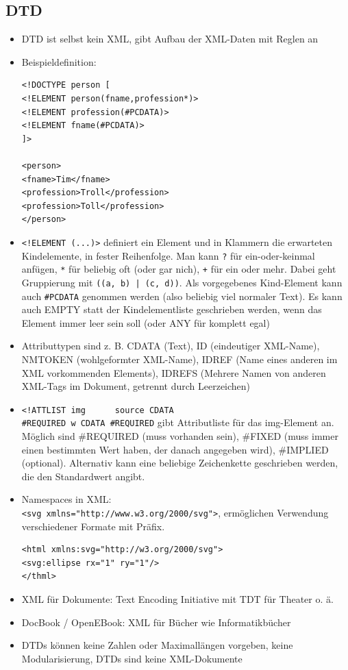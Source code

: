 \documentclass[12pt,landscape]{article}
\begin{document}
\begin{multicols}{3}
\subsection{DTD}
\begin{itemize}
\item DTD ist selbst kein XML, gibt Aufbau der XML-Daten mit Reglen an
\item Beispieldefinition:
\begin{lstlisting}
<!DOCTYPE person [
<!ELEMENT person(fname,profession*)>
<!ELEMENT profession(#PCDATA)>
<!ELEMENT fname(#PCDATA)>
]>

<person>
<fname>Tim</fname>
<profession>Troll</profession>
<profession>Toll</profession>
</person>
\end{lstlisting}
\item \lstinline|<!ELEMENT (...)>| definiert ein Element und in Klammern die erwarteten Kindelemente, in fester Reihenfolge. Man kann \lstinline|?| für ein-oder-keinmal anfügen, \lstinline|*| für beliebig oft (oder gar nich), \lstinline|+| für ein oder mehr. Dabei geht Gruppierung mit \lstinline{((a, b) | (c, d))}. Als vorgegebenes Kind-Element kann auch \lstinline|#PCDATA| genommen werden (also beliebig viel normaler Text). Es kann auch EMPTY statt der Kindelementliste geschrieben werden, wenn das Element immer leer sein soll (oder ANY für komplett egal)
\item Attributtypen sind z. B. CDATA (Text), ID (eindeutiger XML-Name), NMTOKEN (wohlgeformter XML-Name), IDREF (Name eines anderen im XML vorkommenden Elements), IDREFS (Mehrere Namen von anderen XML-Tags im Dokument, getrennt durch Leerzeichen)
\item \lstinline|<!ATTLIST img		source CDATA|\\
\lstinline|#REQUIRED w CDATA #REQUIRED| gibt Attributliste für das img-Element an. Möglich sind \#REQUIRED (muss vorhanden sein), \#FIXED (muss immer einen bestimmten Wert haben, der danach angegeben wird), \#IMPLIED (optional). Alternativ kann eine beliebige Zeichenkette geschrieben werden, die den Standardwert angibt.
\item Namespaces in XML:\\
\lstinline|<svg xmlns="http://www.w3.org/2000/svg">|, ermöglichen Verwendung verschiedener Formate mit Präfix.
\begin{lstlisting}
<html xmlns:svg="http://w3.org/2000/svg">
<svg:ellipse rx="1" ry="1"/>
</thml>
\end{lstlisting}
\item XML für Dokumente: Text Encoding Initiative mit TDT für Theater o. ä. 
\item DocBook / OpenEBook: XML für Bücher wie Informatikbücher
\item DTDs können keine Zahlen oder Maximallängen vorgeben, keine Modularisierung, DTDs sind keine XML-Dokumente
\end{itemize}

\end{multicols}
\end{document}
